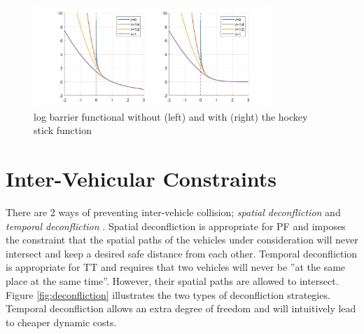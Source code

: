 \begin{figure}
\centering
\includegraphics[width=0.8\textwidth]{Images/logbarrierfunc.jpg}
\caption{log barrier functional without (left) and with (right) the hockey stick function}
\label{fig:logbarrierfunc}
\end{figure}

\section{Inter-Vehicular Constraints}
\label{sec:mindistintveh}

\par There are 2 ways of preventing inter-vehicle collision; \textit{spatial deconfliction} and \textit{temporal deconfliction} \cite{hausler2015mission}.
Spatial deconfliction is appropriate for \ac{PF} and imposes the constraint that the spatial paths of the vehicles under consideration will never intersect and keep a desired safe distance from each other. Temporal deconfliction is appropriate for \ac{TT} and requires that two vehicles will never be ”at the same place at the same time”. However, their spatial paths are allowed to intersect. Figure \ref{fig:deconfliction} illustrates the two types of deconfliction strategies. Temporal deconfliction allows an extra degree of freedom and will intuitively lead to cheaper dynamic costs.

